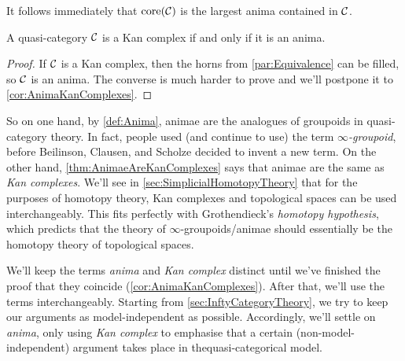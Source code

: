 It follows immediately that $\operatorname{core}(\mathcal{C})$ is the largest anima contained in $\mathcal{C}$.
\begin{thm}\label{thm:AnimaeAreKanComplexes}
	A quasi-category $\mathcal{C}$ is a Kan complex if and only if it is an anima.
\end{thm}
\begin{proof}
	If $\mathcal{C}$ is a Kan complex, then the horns from \cref{par:Equivalence} can be filled, so $\mathcal{C}$ is an anima. The converse is much harder to prove and we'll postpone it to \cref{cor:AnimaKanComplexes}.
\end{proof}
So on one hand, by \cref{def:Anima}, animae are the analogues of groupoids in quasi-category theory. In fact, people used (and continue to use) the term \emph{$\infty$-groupoid}, before Beilinson, Clausen, and Scholze decided to invent a new term. On the other hand, \cref{thm:AnimaeAreKanComplexes} says that animae are the same as \emph{Kan complexes}. We'll see in \cref{sec:SimplicialHomotopyTheory} that for the purposes of homotopy theory, Kan complexes and topological spaces can be used interchangeably. This fits perfectly with Grothendieck's \emph{homotopy hypothesis}, which predicts that the theory of $\infty$-groupoids/animae should essentially be the homotopy theory of topological spaces.

We'll keep the terms \emph{anima} and \emph{Kan complex} distinct until we've finished the proof that they coincide (\cref{cor:AnimaKanComplexes}). After that, we'll use the terms interchangeably. Starting from \cref{sec:InftyCategoryTheory}, we try to keep our arguments as model-independent as possible. Accordingly, we'll settle on \emph{anima}, only using \emph{Kan complex} to emphasise that a certain (non-model-independent) argument takes place in thequasi-categorical model.


